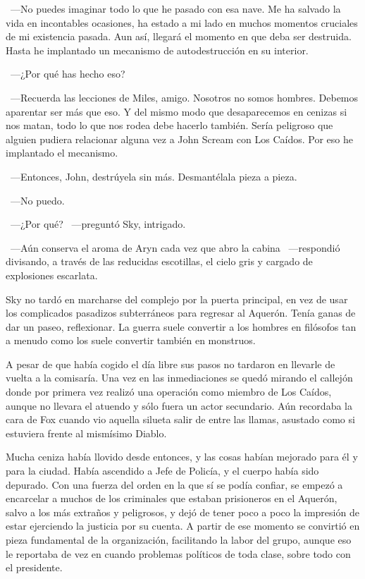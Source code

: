 ~---No puedes imaginar todo lo que he pasado con esa nave. Me ha salvado la vida en incontables ocasiones, ha estado a mi lado en muchos momentos cruciales de mi existencia pasada. Aun así, llegará el momento en que deba ser destruida. Hasta he implantado un mecanismo de autodestrucción en su interior.

~---¿Por qué has hecho eso?

~---Recuerda las lecciones de Miles, amigo. Nosotros no somos hombres. Debemos aparentar ser más que eso. Y del mismo modo que desaparecemos en cenizas si nos matan, todo lo que nos rodea debe hacerlo también. Sería peligroso que alguien pudiera relacionar alguna vez a John Scream con Los Caídos. Por eso he implantado el mecanismo.

~---Entonces, John, destrúyela sin más. Desmantélala pieza a pieza.

~---No puedo.

~---¿Por qué? ~---preguntó Sky, intrigado.

~---Aún conserva el aroma de Aryn cada vez que abro la cabina ~---respondió divisando, a través de las reducidas escotillas, el cielo gris y cargado de explosiones escarlata.

\parbreak
Sky no tardó en marcharse del complejo por la puerta principal, en vez de usar los complicados pasadizos subterráneos para regresar al Aquerón. Tenía ganas de dar un paseo, reflexionar. La guerra suele convertir a los hombres en filósofos tan a menudo como los suele convertir también en monstruos.

A pesar de que había cogido el día libre sus pasos no tardaron en llevarle de vuelta a la comisaría. Una vez en las inmediaciones se quedó mirando el callejón donde por primera vez realizó una operación como miembro de Los Caídos, aunque no llevara el atuendo y sólo fuera un actor secundario. Aún recordaba la cara de Fox cuando vio aquella silueta salir de entre las llamas, asustado como si estuviera frente al mismísimo Diablo.

Mucha ceniza había llovido desde entonces, y las cosas habían mejorado para él y para la ciudad. Había ascendido a Jefe de Policía, y el cuerpo había sido depurado. Con una fuerza del orden en la que sí se podía confiar, se empezó a encarcelar a muchos de los criminales que estaban prisioneros en el Aquerón, salvo a los más extraños y peligrosos, y dejó de tener poco a poco la impresión de estar ejerciendo la justicia por su cuenta. A partir de ese momento se convirtió en pieza fundamental de la organización, facilitando la labor del grupo, aunque eso le reportaba de vez en cuando problemas políticos de toda clase, sobre todo con el presidente.

